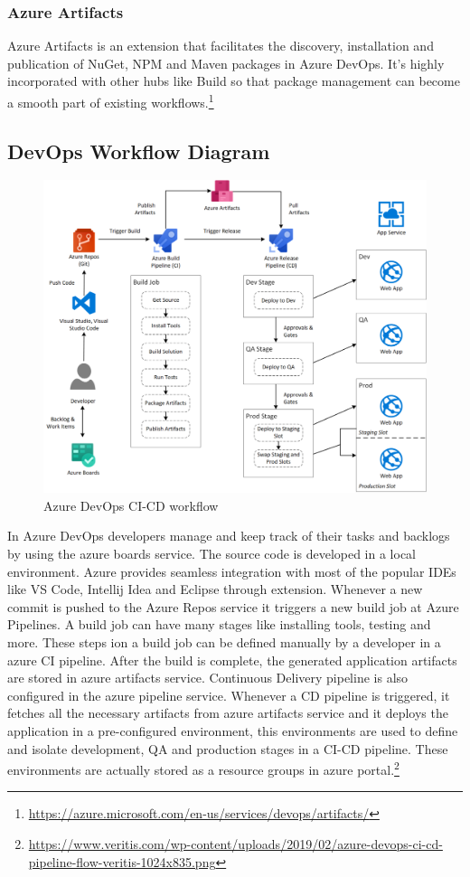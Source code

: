 \subsubsection{Azure Artifacts}
%
Azure Artifacts is an extension that facilitates the discovery, installation and publication of NuGet, NPM and Maven packages in Azure DevOps. It’s highly incorporated with other hubs like Build so that package management can become a smooth part of existing workflows.\footnote{\url{https://azure.microsoft.com/en-us/services/devops/artifacts/}}
%

\subsection{DevOps Workflow Diagram}
%
\begin{figure}[h]
    \centering
    \includegraphics[width=13cm]{images/azure-devops-ci-cd-pipeline-workflow.png}
    \caption{Azure DevOps CI-CD workflow}
    \label{fig:azure-devops-ci-cd-pipeline-workflow}
\end{figure}

In Azure DevOps developers manage and keep track of their tasks and backlogs by using the azure boards service. The source code is developed in a local environment. Azure provides seamless integration with most of the popular IDEs like VS Code, Intellij Idea and Eclipse through extension. Whenever a new commit is pushed to the Azure Repos service it triggers a new build job at Azure Pipelines. A build job can have many stages like installing tools, testing and more. These steps ion a build job can be defined manually by a developer in a azure CI pipeline. After the build is complete, the generated application artifacts are stored in azure artifacts service. Continuous Delivery pipeline is also configured in the azure pipeline service. Whenever a CD pipeline is triggered, it fetches all the necessary artifacts from azure artifacts service and it deploys the application in a pre-configured environment, this environments are used to define and isolate development, QA and production stages in a CI-CD pipeline. These environments are actually stored as a resource groups in azure portal.\footnote{\url{https://www.veritis.com/wp-content/uploads/2019/02/azure-devops-ci-cd-pipeline-flow-veritis-1024x835.png}}

